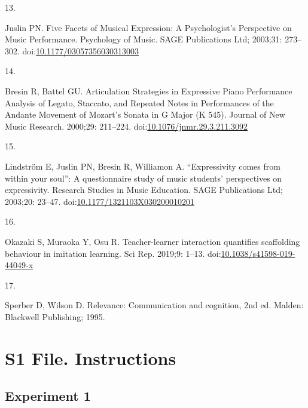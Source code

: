 \documentclass[
  english,
  man,floatsintext]{apa6}
\newlength{\cslhangindent}
\newlength{\csllabelwidth}
\newlength{\cslentryspacingunit} %
\newenvironment{CSLReferences}[2] %
 {%
  \setlength{\parindent}{0pt}
  \ifodd #1
  \let\oldpar\par
  \def\par{\hangindent=\cslhangindent\oldpar}
  \fi
  \setlength{\parskip}{#2\cslentryspacingunit}
 }%
 {}
\newcommand{\CSLLeftMargin}[1]{\parbox[t]{\csllabelwidth}{#1}}
\newcommand{\CSLRightInline}[1]{\parbox[t]{\linewidth - \csllabelwidth}{#1}\break}
\begin{document}
\begin{CSLReferences}{0}{0}
\leavevmode{}%
\CSLLeftMargin{13. }
\CSLRightInline{Juslin PN. Five {Facets} of {Musical Expression}: {A Psychologist}'s {Perspective} on {Music Performance}. Psychology of Music. {SAGE Publications Ltd}; 2003;31: 273--302. doi:\href{https://doi.org/10.1177/03057356030313003}{10.1177/03057356030313003}}

\leavevmode{}%
\CSLLeftMargin{14. }
\CSLRightInline{Bresin R, Battel GU. Articulation {Strategies} in {Expressive Piano Performance Analysis} of {Legato}, {Staccato}, and {Repeated Notes} in {Performances} of the {Andante Movement} of {Mozart}'s {Sonata} in {G Major} ({K} 545). Journal of New Music Research. 2000;29: 211--224. doi:\href{https://doi.org/10.1076/jnmr.29.3.211.3092}{10.1076/jnmr.29.3.211.3092}}

\leavevmode{}%
\CSLLeftMargin{15. }
\CSLRightInline{Lindström E, Juslin PN, Bresin R, Williamon A. {``{Expressivity} comes from within your soul''}: {A} questionnaire study of music students' perspectives on expressivity. Research Studies in Music Education. {SAGE Publications Ltd}; 2003;20: 23--47. doi:\href{https://doi.org/10.1177/1321103X030200010201}{10.1177/1321103X030200010201}}

\leavevmode{}%
\CSLLeftMargin{16. }
\CSLRightInline{Okazaki S, Muraoka Y, Osu R. Teacher-learner interaction quantifies scaffolding behaviour in imitation learning. Sci Rep. 2019;9: 1--13. doi:\href{https://doi.org/10.1038/s41598-019-44049-x}{10.1038/s41598-019-44049-x}}

\leavevmode{}%
\CSLLeftMargin{17. }
\CSLRightInline{Sperber D, Wilson D. Relevance: {Communication} and cognition, 2nd ed. {Malden}: {Blackwell Publishing}; 1995. }

\end{CSLReferences}

\endgroup

\clearpage

\hypertarget{s1-file.-instructions}{%
\section{S1 File. Instructions}\label{s1-file.-instructions}}

\hypertarget{experiment-1-1}{%
\subsection{Experiment 1}\label{experiment-1-1}}
\end{document}
